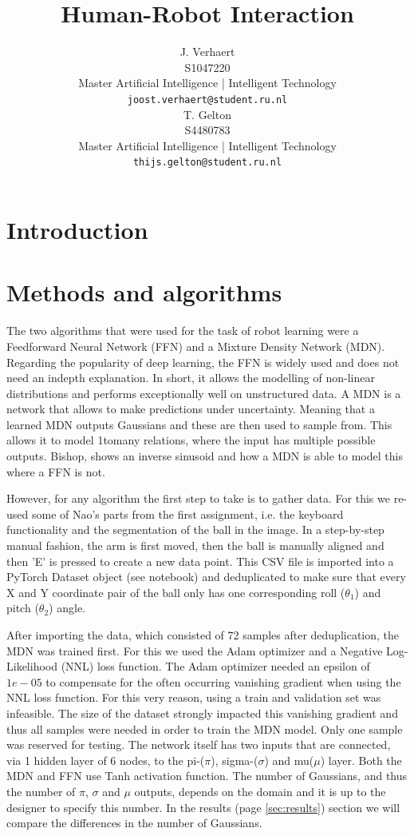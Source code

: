 \documentclass{article}
\title{Human-Robot Interaction}
\date{}
\author{
    J. Verhaert \\
    S1047220\\
    Master Artificial Intelligence | Intelligent Technology \\
    \texttt{joost.verhaert@student.ru.nl} \\
    \And
    T. Gelton \\
    S4480783\\
    Master Artificial Intelligence | Intelligent Technology \\
    \texttt{thijs.gelton@student.ru.nl} \\
}
\begin{document}
    \maketitle
    \pagebreak


    \section{Introduction}\label{sec:introduction}


    \section{Methods and algorithms}\label{sec:methods-and-algorithms}
    The two algorithms that were used for the task of robot learning were a Feedforward Neural Network (FFN) and a Mixture Density Network (MDN).
    Regarding the popularity of deep learning, the FFN is widely used and does not need an in\-depth explanation.
    In short, it allows the modelling of non-linear distributions and performs exceptionally well on unstructured data.
    A MDN is a network that allows to make predictions under uncertainty.
    Meaning that a learned MDN outputs Gaussians and these are then used to sample from.
    This allows it to model 1\-to\-many relations, where the input has multiple possible outputs.
    Bishop\cite{bishop1994mixture}, shows an inverse sinusoid and how a MDN is able to model this where a FFN is not.

    However, for any algorithm the first step to take is to gather data.
    For this we re-used some of Nao's parts from the first assignment, i.e. the keyboard functionality and the segmentation of the ball in the image.
    In a step-by-step manual fashion, the arm is first moved, then the ball is manually aligned and then 'E' is pressed to create a new data point.
    This CSV file is imported into a PyTorch Dataset object (see notebook) and deduplicated to make sure that every X and Y coordinate pair of the ball only has one corresponding roll ($\theta_1$) and pitch ($\theta_2$) angle.

    After importing the data, which consisted of 72 samples after deduplication, the MDN was trained first.
    For this we used the Adam optimizer and a Negative Log-Likelihood (NNL) loss function.
    The Adam optimizer needed an epsilon of $1e-05$ to compensate for the often occurring vanishing gradient when using the NNL loss function.
    For this very reason, using a train and validation set was infeasible. 
    The size of the dataset strongly impacted this vanishing gradient and thus all samples were needed in order to train the MDN model.   
    Only one sample was reserved for testing.
    The network itself has two inputs that are connected, via 1 hidden layer of 6 nodes, to the pi-($\pi$), sigma-($\sigma$) and mu($\mu$) layer.
    Both the MDN and FFN use Tanh activation function.
    The number of Gaussians, and thus the number of $\pi$, $\sigma$ and $\mu$ outputs, depends on the domain and it is up to the designer to specify this number.
    In the results (page \ref{sec:results}) section we will compare the differences in the number of Gaussians.
\end{document}
